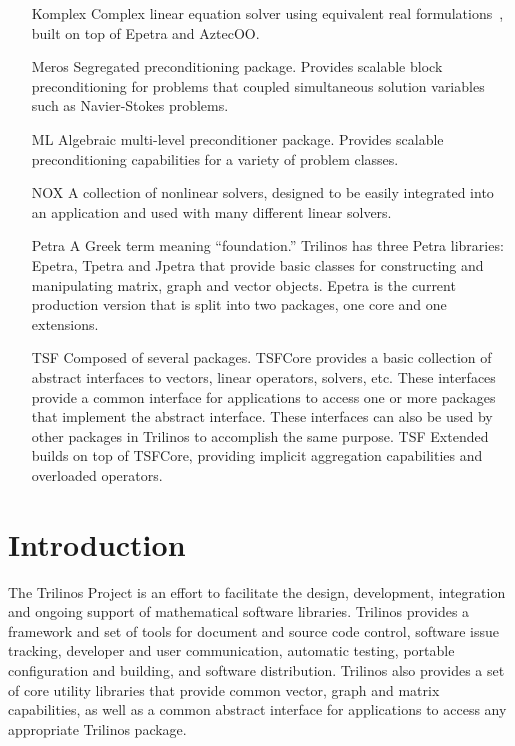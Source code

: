 \documentclass[12pt,strict]{TrilinosDevGuide}
\begin{document}
\begin{itemize}
\item[Komplex] 
Complex linear equation solver using equivalent real 
formulations~\cite{DayHero2000}, built on top of Epetra and AztecOO.

\item[Meros]
Segregated preconditioning package.  Provides scalable block
preconditioning for problems that coupled simultaneous solution
variables such as Navier-Stokes problems.

\item[ML]
Algebraic multi-level preconditioner package.  Provides scalable
preconditioning capabilities for a variety of problem classes.

\item[NOX]
A collection of nonlinear solvers, designed to be easily integrated
into an application and used with many different linear solvers.

\item[Petra]
A Greek term meaning ``foundation.''  Trilinos has three Petra 
libraries: Epetra, Tpetra and Jpetra that provide basic classes 
for constructing and manipulating matrix, graph and vector
objects.  Epetra is the current production version that is
split into two packages, one core and one extensions.

\item[TSF]
Composed of several packages.  TSFCore provides 
a basic collection of abstract interfaces to vectors, linear
operators, solvers, etc.  These interfaces provide a common
interface for applications to access one or more packages that
implement the abstract interface.  These interfaces can also be used
by other packages in Trilinos to accomplish the same purpose.
TSF Extended builds on top of TSFCore, providing implicit
aggregation capabilities and overloaded operators.

\end{itemize}


\section{Introduction}
\label{Section:Introduction}
The Trilinos Project is an effort to facilitate the design, development,
integration and ongoing support of mathematical software libraries.  Trilinos 
provides a framework and set of tools for document and source code control,
software issue tracking, developer and user communication, automatic
testing, portable configuration and building, and software
distribution.  Trilinos also provides a set of core utility libraries
that provide common vector, graph and matrix capabilities, as well as
a common abstract interface for applications to access any appropriate
Trilinos package.
\end{document}
